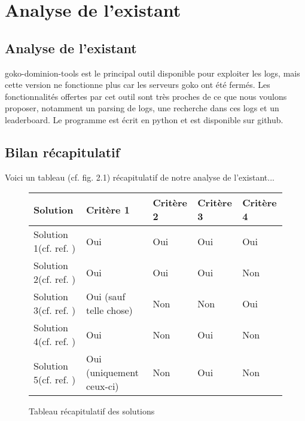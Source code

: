 \chapter{Analyse de l'existant}

\section{Analyse de l'existant}
goko-dominion-tools est le principal outil disponible pour exploiter les logs, mais cette version ne fonctionne plus car les serveurs goko ont été fermés. Les fonctionnalités offertes par cet outil sont très proches de ce que nous voulons proposer, notamment un parsing de logs, une recherche dans ces logs et un leaderboard. Le programme est écrit en python et est disponible sur github.


\section{Bilan récapitulatif}

Voici un tableau (cf. fig. 2.1) récapitulatif de notre analyse de l'existant...\\

\begin{figure}[!h]
\begin{center}
\begin{tabular}{|l|l|l|l|l|}
  \hline
  Solution & Critère 1 & Critère 2 & Critère 3 & Critère 4\\
  \hline
  Solution 1(cf. ref. \cite{cite0}) & Oui & Oui & Oui & Oui \\
  Solution 2(cf. ref. \cite{cite1}) & Oui & Oui & Oui & Non \\
  Solution 3(cf. ref. \cite{cite2}) & Oui (sauf telle chose) & Non & Non & Oui\\
  Solution 4(cf. ref. \cite{cite3}) & Oui& Non & Oui & Non\\
  Solution 5(cf. ref. \cite{cite4}) & Oui (uniquement ceux-ci) & Non & Oui & Non\\
  \hline
\end{tabular}
\end{center}
\caption{Tableau récapitulatif des solutions}
\end{figure}
